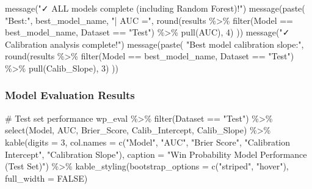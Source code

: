 \documentclass[
  letterpaper,
  DIV=11,
  numbers=noendperiod]{scrartcl}
\newenvironment{Shaded}{\begin{snugshade}}{\end{snugshade}}
\newcommand{\AttributeTok}[1]{\textcolor[rgb]{0.40,0.45,0.13}{#1}}
\newcommand{\CommentTok}[1]{\textcolor[rgb]{0.37,0.37,0.37}{#1}}
\newcommand{\ConstantTok}[1]{\textcolor[rgb]{0.56,0.35,0.01}{#1}}
\newcommand{\DecValTok}[1]{\textcolor[rgb]{0.68,0.00,0.00}{#1}}
\newcommand{\FunctionTok}[1]{\textcolor[rgb]{0.28,0.35,0.67}{#1}}
\newcommand{\NormalTok}[1]{\textcolor[rgb]{0.00,0.23,0.31}{#1}}
\newcommand{\SpecialCharTok}[1]{\textcolor[rgb]{0.37,0.37,0.37}{#1}}
\newcommand{\StringTok}[1]{\textcolor[rgb]{0.13,0.47,0.30}{#1}}
\begin{document}
\begin{Shaded}
\begin{Highlighting}[]
\FunctionTok{message}\NormalTok{(}\StringTok{"✓ ALL models complete (including Random Forest)!"}\NormalTok{)}
\FunctionTok{message}\NormalTok{(}\FunctionTok{paste}\NormalTok{(}
  \StringTok{"Best:"}\NormalTok{, best\_model\_name, }\StringTok{"| AUC ="}\NormalTok{,}
  \FunctionTok{round}\NormalTok{(results }\SpecialCharTok{\%\textgreater{}\%} \FunctionTok{filter}\NormalTok{(Model }\SpecialCharTok{==}\NormalTok{ best\_model\_name, Dataset }\SpecialCharTok{==} \StringTok{"Test"}\NormalTok{) }\SpecialCharTok{\%\textgreater{}\%} \FunctionTok{pull}\NormalTok{(AUC), }\DecValTok{4}\NormalTok{)}
\NormalTok{))}
\FunctionTok{message}\NormalTok{(}\StringTok{"✓ Calibration analysis complete!"}\NormalTok{)}
\FunctionTok{message}\NormalTok{(}\FunctionTok{paste}\NormalTok{(}
  \StringTok{"Best model calibration slope:"}\NormalTok{,}
  \FunctionTok{round}\NormalTok{(results }\SpecialCharTok{\%\textgreater{}\%} \FunctionTok{filter}\NormalTok{(Model }\SpecialCharTok{==}\NormalTok{ best\_model\_name, Dataset }\SpecialCharTok{==} \StringTok{"Test"}\NormalTok{) }\SpecialCharTok{\%\textgreater{}\%} \FunctionTok{pull}\NormalTok{(Calib\_Slope), }\DecValTok{3}\NormalTok{)}
\NormalTok{))}
\end{Highlighting}
\end{Shaded}

\subsubsection{Model Evaluation Results}\label{model-evaluation-results}

\begin{Shaded}
\begin{Highlighting}[]
\CommentTok{\# Test set performance}
\NormalTok{wp\_eval }\SpecialCharTok{\%\textgreater{}\%}
  \FunctionTok{filter}\NormalTok{(Dataset }\SpecialCharTok{==} \StringTok{"Test"}\NormalTok{) }\SpecialCharTok{\%\textgreater{}\%}
  \FunctionTok{select}\NormalTok{(Model, AUC, Brier\_Score, Calib\_Intercept, Calib\_Slope) }\SpecialCharTok{\%\textgreater{}\%}
  \FunctionTok{kable}\NormalTok{(}\AttributeTok{digits =} \DecValTok{3}\NormalTok{, }
        \AttributeTok{col.names =} \FunctionTok{c}\NormalTok{(}\StringTok{"Model"}\NormalTok{, }\StringTok{"AUC"}\NormalTok{, }\StringTok{"Brier Score"}\NormalTok{, }\StringTok{"Calibration Intercept"}\NormalTok{, }\StringTok{"Calibration Slope"}\NormalTok{),}
        \AttributeTok{caption =} \StringTok{"Win Probability Model Performance (Test Set)"}\NormalTok{) }\SpecialCharTok{\%\textgreater{}\%}
  \FunctionTok{kable\_styling}\NormalTok{(}\AttributeTok{bootstrap\_options =} \FunctionTok{c}\NormalTok{(}\StringTok{"striped"}\NormalTok{, }\StringTok{"hover"}\NormalTok{), }\AttributeTok{full\_width =} \ConstantTok{FALSE}\NormalTok{)}
\end{Highlighting}
\end{Shaded}
\end{document}
